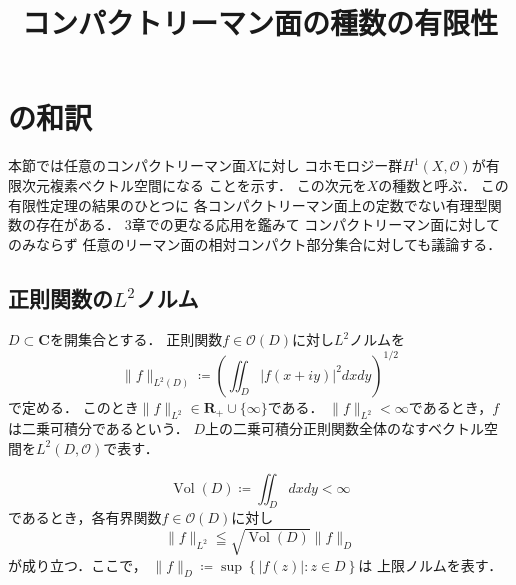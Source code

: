 \documentclass[12pt, a4paper, dvipdfmx]{jsarticle}
\theoremstyle{definition}
\newcommand{\rr}{\mathbf{R}}
\newcommand{\cc}{\mathbf{C}}
\newcommand{\mcal}{\mathcal}
\newcommand{\OO}{\mcal{O}}
\newcommand{\abs}[1]{\lvert #1 \rvert}
\newcommand{\nm}[1]{\lVert #1 \rVert}
\theoremstyle{mystyle}
\numberwithin{equation}{section} %
\newcommand{\Vol}{\mathop{\mathrm{Vol}}}
\begin{document}
\title{コンパクトリーマン面の種数の有限性}
\author{}
\date{}

\maketitle

\section{\cite[\S 14]{Fo81}の和訳}
\setcounter{section}{14}

本節では任意のコンパクトリーマン面$X$に対し
コホモロジー群$H^1(X,\OO)$が有限次元複素ベクトル空間になる
ことを示す．
この次元を$X$の種数と呼ぶ．
この有限性定理の結果のひとつに
各コンパクトリーマン面上の定数でない有理型関数の存在がある．
3章での更なる応用を鑑みて
コンパクトリーマン面に対してのみならず
任意のリーマン面の相対コンパクト部分集合に対しても議論する．

\subsection{正則関数の$L^2$ノルム}
$D\subset \cc$を開集合とする．
正則関数$f\in\OO(D)$に対し$L^2$ノルムを
\begin{equation*}
  \nm{f}_{L^2(D)}
  \coloneqq\left(\iint_{D}\abs{f(x+iy)}^2dxdy\right)^{1/2}
\end{equation*}
で定める．
このとき$\nm{f}_{L^{2}}\in\rr_+\cup\{\infty\}$である．
$\nm{f}_{L^{2}}<\infty$であるとき，$f$は二乗可積分であるという．
$D$上の二乗可積分正則関数全体のなすベクトル空間を$L^2(D,\OO)$で表す．

\begin{equation*}
  \Vol(D)\coloneqq\iint_Ddxdy<\infty  
\end{equation*}
であるとき，各有界関数$f\in\OO(D)$に対し
\begin{equation*}
  \nm{f}_{L^{2}}\leqq\sqrt{\Vol(D)}\nm{f}_{D}
\end{equation*}
が成り立つ．ここで，
$\nm{f}_{D}\coloneqq\sup\left\{\abs{f(z)}:z\in D\right\}$は
上限ノルムを表す．
\end{document}
